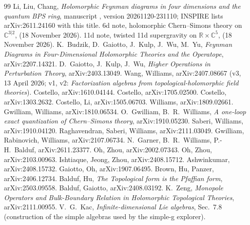 \documentclass[10pt,a4paper]{article}
\numberwithin{equation}{section}
\theoremstyle{definition}
\theoremstyle{remark}
\begin{document}
\begin{thebibliography}{99}\small
{} Li, Liu, Chang, \emph{Holomorphic Feynman diagrams in four dimensions and the quantum BPS ring}, manuscript , version 20261120-231110; INSPIRE lists arXiv:2611.24160 with this title.
 6d note, holomorphic Chern--Simons theory on $\mathbb C^{3|2}$,  (18 November 2026).
 11d note, twisted 11d supergravity on $\mathbb R\times\mathbb C^5$,  (18 November 2026).
 K.~Budzik, D.~Gaiotto, J.~Kulp, J.~Wu, M.~Yu, \emph{Feynman Diagrams in Four-Dimensional Holomorphic Theories and the Operatope}, arXiv:2207.14321.
 D.~Gaiotto, J.~Kulp, J.~Wu, \emph{Higher Operations in Perturbation Theory}, arXiv:2403.13049.
 Wang, Williams, arXiv:2407.08667 (v3, 13 April 2026; v1, v2: \emph{Factorization algebras from topological-holomorphic field theories}).
 Costello, arXiv:1610.04144.
 Costello, arXiv:1705.02500.
 Costello, arXiv:1303.2632.
 Costello, Li, arXiv:1505.06703.
 Williams, arXiv:1809.02661.
 Gwilliam, Williams, arXiv:1810.06534.
 O.~Gwilliam, B.~R.~Williams, \emph{A one-loop exact quantization of Chern--Simons theory}, arXiv:1910.05230.
 Saberi, Williams, arXiv:1910.04120.
 Raghavendran, Saberi, Williams, arXiv:2111.03049.
 Gwilliam, Rabinovich, Williams, arXiv:2107.06734.
 N.~Garner, B.~R.~Williams, P.-H.~Balduf, arXiv:2611.23377.
 Oh, Zhou, arXiv:2002.07343.
 Oh, Zhou, arXiv:2103.00963.
 Ishtiaque, Jeong, Zhou, arXiv:2408.15712.
 Ashwinkumar, arXiv:2408.15732.
 Gaiotto, Oh, arXiv:1907.06495.
 Brown, Hu, Panzer, arXiv:2406.12734.
 Balduf, Hu, \emph{The Topological form is the Pfaffian form}, arXiv:2503.09558.
 Balduf, Gaiotto, arXiv:2408.03192.
 K.~Zeng, \emph{Monopole Operators and Bulk-Boundary Relation in Holomorphic Topological Theories}, arXiv:2111.00955.
 V.~G.~Kac, \emph{Infinite-dimensional Lie algebras}, Sec.~7.8 (construction of the simple algebras used by the simple-g explorer).
\end{thebibliography}
\end{document}
